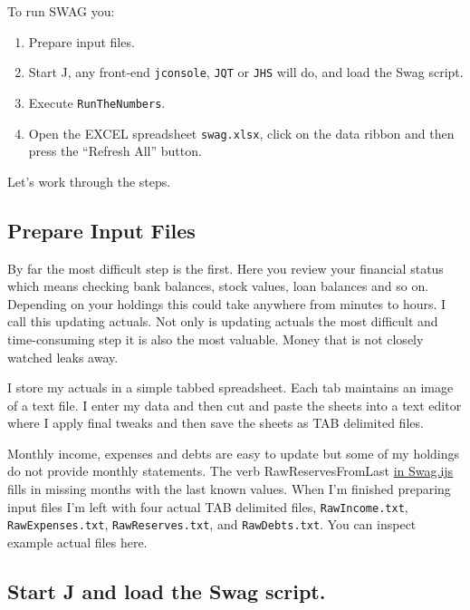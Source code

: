 To run SWAG you:

\begin{enumerate}
\def\labelenumi{\arabic{enumi}.}
\item
  Prepare input files.
\item
  Start J, any front-end \texttt{jconsole}, \texttt{JQT} or \texttt{JHS}
  will do, and load the Swag script.
\item
  Execute \texttt{RunTheNumbers}.
\item
  Open the EXCEL spreadsheet \texttt{swag.xlsx}, click on the data
  ribbon and then press the ``Refresh All'' button.
\end{enumerate}

Let's work through the steps.

\subsection*{Prepare Input Files}%

By far the most difficult step is the first. Here you review your
financial status which means checking bank balances, stock values, loan
balances and so on. Depending on your holdings this could take anywhere
from minutes to hours. I call this updating actuals. Not only is
updating actuals the most difficult and time-consuming step it is also
the most valuable. Money that is not closely watched leaks away.

I store my actuals in a simple tabbed spreadsheet. Each tab maintains an
image of a text file. I enter my data and then cut and paste the sheets
into a text editor where I apply final tweaks and then save the sheets
as TAB delimited files.

Monthly income, expenses and debts are easy to update but some of my
holdings do not provide monthly statements. The verb RawReservesFromLast
\href{https://github.com/bakerjd99/jacks/blob/master/swag/scripts/Swag.ijs}{in
Swag.ijs} fills in missing months with the last known values. When I'm
finished preparing input files I'm left with four actual TAB delimited
files, \texttt{RawIncome.txt}, \texttt{RawExpenses.txt},
\texttt{RawReserves.txt}, and \texttt{RawDebts.txt}. You can inspect
example actual files here.

\subsection*{Start J and load the Swag script.}%

